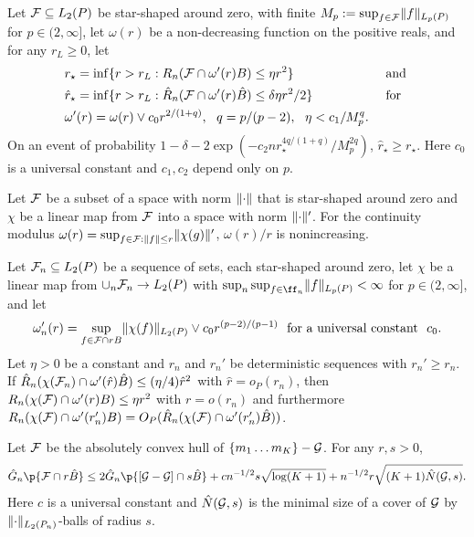 \begin{lemm}
\label{lemma:empirical-vs-pop-local-complexity}
Let $\F \subseteq L_2(\P)$ be star-shaped around zero, with finite $M_p := \sup_{f \in \mathcal{F}} \lVert f\rVert_{L_p(P)}$ for $p \in (2,\infty]$,
let $\omega(r)$ be a non-decreasing function on the positive reals, and for any $r_L \ge 0$, let 
\begin{align*}
&r_{\star} = \inf\set{ r > r_L : R_n(\F \cap \omega'(r) B) \le \eta r^2} && \text{ and } \\
&\hat r_{\star} = \inf \set{ r > r_L : \hat R_n(\F \cap \omega'(r) \hat B) \le \delta \eta r^2/2} && \text{ for } \\
&\omega'(r) = \omega(r) \vee c_0 r^{2/(1+q)}, \ \ q=p/(p-2), \ \ \eta < c_1/M_p^q.
\end{align*} 
On an event of probability $1-\delta - 2\exp(-c_2 n r_\star^{4q/(1+q)}/M_p^{2q})$, $\hat r_{\star} \ge r_{\star}$.
Here $c_0$ is a universal constant and $c_1,c_2$ depend only on $p$.
\end{lemm}

\begin{lemm}
\label{lemma:non-increasing-modulus}
Let $\mathcal{F}$ be a subset of a space with norm $\lVert\cdot\rVert$ that is star-shaped around zero and $\chi$ be a linear map from $\mathcal{F}$ into a space with norm $\lVert\cdot\rVert'$. For the continuity modulus $\omega(r) = \sup_{f \in \mathcal{F} : \lVert f\rVert \le r} \lVert\chi(g)\rVert'$, $\omega(r)/r$ is nonincreasing. 
\end{lemm}

\begin{coro}
\label{cor:empirical-vs-pop-local-complexity}
Let $\F_n \subseteq L_2(\P)$ be a sequence of sets, each star-shaped around zero, 
let $\chi$ be a linear map from $\cup_{n}\F_n \to L_2(\P)$ 
with $\sup_n \sup_{f \in \ff_n} \norm{f}_{L_p(\P)} < \infty$ for $p \in (2,\infty]$,
and let 
\[ \omega_n'(r) = \sup_{f \in \F \cap r B} \norm{\chi(f)}_{L_2(\P)} \vee c_0 r^{(p-2)/(p-1)}
\ \text{ for a universal constant }\ c_0.
 \]
Let $\eta > 0$ be a constant and $r_n$ and $r_n'$ be deterministic sequences with $r_n' \ge r_n$.
If $\hat R_n(\chi(\mathcal{F}_n) \cap \omega'(\hat r) \hat B) \le (\eta/4) \hat r^2$ with $\hat r = o_P(r_n)$,
then $R_n(\chi(\mathcal{F}) \cap \omega'(r)B) \le \eta r^2$ with $r=o(r_n)$ 
and furthermore $R_n(\chi(\mathcal{F}) \cap \omega'(r_n')B) = O_P( \hat R_n(\chi(\mathcal{F}) \cap \omega'(r_n') \hat B))$.
\end{coro}

\begin{lemm}
\label{lemma:gaussian-comparison-convex-hull}
Let $\mathcal{F}$ be the absolutely convex hull of $\{m_1 \ldots m_{K}\} - \mathcal{G}$. For any $r, s > 0$,
\[ \hat G_n\p{\F \cap r \hat B} \le 2 \hat G_n\p{[\GG - \GG] \cap s \hat B} + cn^{-1/2} s \sqrt{\log(K+1)} +  n^{-1/2} r \sqrt{(K+1)\hat N(\GG, s)}. \]
Here $c$ is a universal constant and $\hat N(\mathcal{G}, s)$ is the minimal size of a cover of $\mathcal{G}$ by $\norm{\cdot}_{L_2(\Pn)}$-balls of radius $s$.
\end{lemm}


